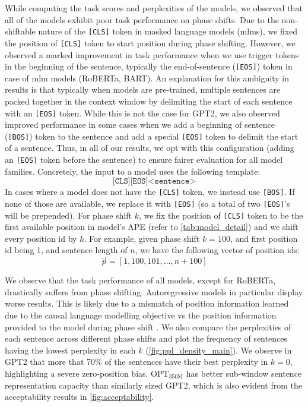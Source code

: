 \documentclass[letterpaper, 12pt]{report}
\begin{document}
While computing the task scores and perplexities of the models, we observed that all of the models exhibit poor task performance on phase shifts.
Due to the non-shiftable nature of the \texttt{[CLS]} token in masked language models (\acrshort{mlm}s), we fixed the position of \texttt{[CLS]} token to start position during phase shifting.
However, we observed a marked improvement in task performance when we use trigger tokens in the beginning of the sentence, typically the end-of-sentence (\texttt{[EOS]}) token in case of \acrshort{mlm} models (RoBERTa, BART).
An explanation for this ambiguity in results is that typically when models are pre-trained, multiple sentences are packed together in the context window by delimiting the start of each sentence with an \texttt{[EOS]} token.
While this is not the case for GPT2, we also observed improved performance in some cases when we add a beginning of sentence (\texttt{[BOS]}) token to the sentence and add a special \texttt{[EOS]} token to delimit the start of a sentence. Thus, in all of our results, we opt with this configuration (adding an \texttt{[EOS]} token before the sentence) to ensure fairer evaluation for all model families.
Concretely, the input to a model uses the following template:
$$
\texttt{[CLS]}\texttt{[EOS]} \texttt{<sentence>}
$$
In cases where a model does not have the \texttt{[CLS]} token, we instead use \texttt{[BOS]}.
If none of those are available, we replace it with \texttt{[EOS]} (so a total of two \texttt{[EOS]}'s will be prepended).
For phase shift $k$, we fix the position of \texttt{[CLS]} token to be the first available position in model's APE (refer to \autoref{tab:model_detail}) and we shift every position id by $k$.
For example, given phase shift $k=100$, and first position id being 1, and sentence length of $n$, we have the following vector of position ids:
$$
\Vec{p} = [1, 100, 101, \dots, n+100]
$$


We observe that the task performance of all models, except for RoBERTa, drastically suffers from phase shifting. Autoregressive models in particular display worse results. This is likely due to a mismatch of position information learned due to the causal language modelling objective vs the position information provided to the model during phase shift \citep{haviv2022}. We also compare the perplexities of each sentence across different phase shifts and plot the frequency of sentences having the lowest perplexity in each $k$ (\autoref{fig:ppl_density_main}). We observe in GPT2 that more that 70\% of the sentences have their best perplexity in $k=0$, highlighting a severe zero-position bias. $\text{OPT}_{\text{350M}}$ has better sub-window sentence representation capacity than similarly sized GPT2, which is also evident from the acceptability results in \autoref{fig:acceptability}.
\end{document}
